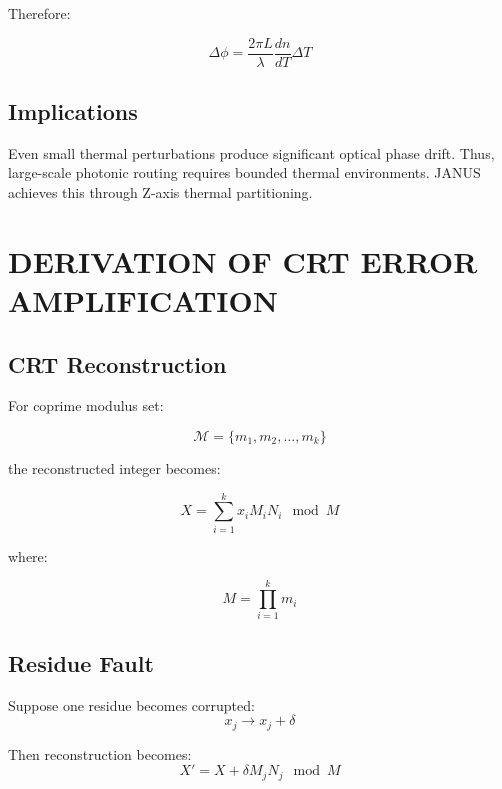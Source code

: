 \documentclass[journal]{IEEEtran}
\begin{document}
Therefore:

\begin{equation}
\Delta \phi = \frac{2\pi L}{\lambda} \frac{dn}{dT} \Delta T
\end{equation}

\subsection{\textbf{Implications}}

Even small thermal perturbations produce significant optical phase drift. Thus, large-scale photonic routing requires bounded thermal environments. JANUS achieves this through Z-axis thermal partitioning.

\section{DERIVATION OF CRT ERROR AMPLIFICATION}

\subsection{\textbf{CRT Reconstruction}}

For coprime modulus set:

\begin{equation}
\mathcal{M} = \{m_1, m_2, \dots, m_k\}
\end{equation}

the reconstructed integer becomes:

\begin{equation}
X = \sum_{i=1}^k x_i M_i N_i \mod M
\end{equation}

where:

\begin{equation}
M = \prod_{i=1}^k m_i
\end{equation}

\subsection{\textbf{Residue Fault}}

Suppose one residue becomes corrupted:
\begin{equation}
x_j \rightarrow x_j + \delta
\end{equation}

Then reconstruction becomes:
\begin{equation}
X ' = X + \delta M_j N_j \mod M
\end{equation}
\end{document}
